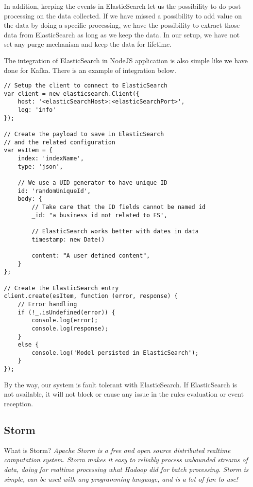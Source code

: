 In addition, keeping the events in ElasticSearch let us the possibility to do post processing on the data collected. If we have missed a possibility to add value on the data by doing a specific processing, we have the possibility to extract those data from ElasticSearch as long as we keep the data. In our setup, we have not set any purge mechanism and keep the data for lifetime.

The integration of ElasticSearch in NodeJS application is also simple like we have done for Kafka. There is an example of integration below.

\begin{lstlisting}
// Setup the client to connect to ElasticSearch
var client = new elasticsearch.Client({
	host: '<elasticSearchHost>:<elasticSearchPort>',
	log: 'info'
});

// Create the payload to save in ElasticSearch 
// and the related configuration
var esItem = {
	index: 'indexName',
	type: 'json',

	// We use a UID generator to have unique ID
	id: 'randomUniqueId', 
	body: {
		// Take care that the ID fields cannot be named id
		_id: "a business id not related to ES', 

		// ElasticSearch works better with dates in data
		timestamp: new Date() 

		content: "A user defined content",
	}
};

// Create the ElasticSearch entry
client.create(esItem, function (error, response) {
	// Error handling
	if (!_.isUndefined(error)) {
		console.log(error);
		console.log(response);
	}
	else {
		console.log('Model persisted in ElasticSearch');
	}
});
\end{lstlisting}

By the way, our system is fault tolerant with ElasticSearch. If ElasticSearch is not available, it will not block or cause any issue in the rules evaluation or event reception. 

\subsection{Storm}

What is Storm? \emph{Apache Storm is a free and open source distributed realtime computation system. Storm makes it easy to reliably process unbounded streams of data, doing for realtime processing what Hadoop did for batch processing. Storm is simple, can be used with any programming language, and is a lot of fun to use!}


